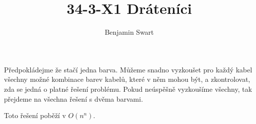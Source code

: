 \documentclass{article}
\title{34-3-X1 Dráteníci}
\author{Benjamin Swart}
\begin{document}
\maketitle

Předpokládejme že stačí jedna barva. Můžeme snadno vyzkoušet pro každý kabel všechny možné kombinace barev kabelů, které v něm mohou být, a zkontrolovat, zda se jedná o platné řešení problému. Pokud neúspěšně vyzkoušíme všechny, tak přejdeme na všechna řešení s dvěma barvami.

Toto řešení poběží v \(O(n^n)\).
\end{document}
